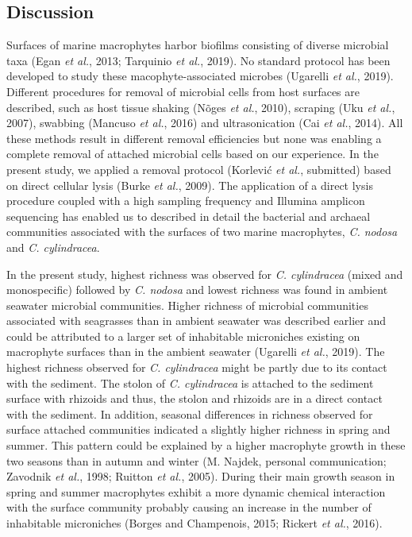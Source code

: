 \documentclass[12pt,]{article}
\begin{document}
\newpage

\hypertarget{discussion}{%
\subsection{Discussion}\label{discussion}}

Surfaces of marine macrophytes harbor biofilms consisting of diverse
microbial taxa (Egan \emph{et al.}, 2013; Tarquinio \emph{et al.},
2019). No standard protocol has been developed to study these
macophyte-associated microbes (Ugarelli \emph{et al.}, 2019). Different
procedures for removal of microbial cells from host surfaces are
described, such as host tissue shaking (Nõges \emph{et al.}, 2010),
scraping (Uku \emph{et al.}, 2007), swabbing (Mancuso \emph{et al.},
2016) and ultrasonication (Cai \emph{et al.}, 2014). All these methods
result in different removal efficiencies but none was enabling a
complete removal of attached microbial cells based on our experience. In
the present study, we applied a removal protocol (Korlević \emph{et
al.}, submitted) based on direct cellular lysis (Burke \emph{et al.},
2009). The application of a direct lysis procedure coupled with a high
sampling frequency and Illumina amplicon sequencing has enabled us to
described in detail the bacterial and archaeal communities associated
with the surfaces of two marine macrophytes, \emph{C. nodosa} and
\emph{C. cylindracea}.

In the present study, highest richness was observed for \emph{C.
cylindracea} (mixed and monospecific) followed by \emph{C. nodosa} and
lowest richness was found in ambient seawater microbial communities.
Higher richness of microbial communities associated with seagrasses than
in ambient seawater was described earlier and could be attributed to a
larger set of inhabitable microniches existing on macrophyte surfaces
than in the ambient seawater (Ugarelli \emph{et al.}, 2019). The highest
richness observed for \emph{C. cylindracea} might be partly due to its
contact with the sediment. The stolon of \emph{C. cylindracea} is
attached to the sediment surface with rhizoids and thus, the stolon and
rhizoids are in a direct contact with the sediment. In addition,
seasonal differences in richness observed for surface attached
communities indicated a slightly higher richness in spring and summer.
This pattern could be explained by a higher macrophyte growth in these
two seasons than in autumn and winter (M. Najdek, personal
communication; Zavodnik \emph{et al.}, 1998; Ruitton \emph{et al.},
2005). During their main growth season in spring and summer macrophytes
exhibit a more dynamic chemical interaction with the surface community
probably causing an increase in the number of inhabitable microniches
(Borges and Champenois, 2015; Rickert \emph{et al.}, 2016).
\end{document}
